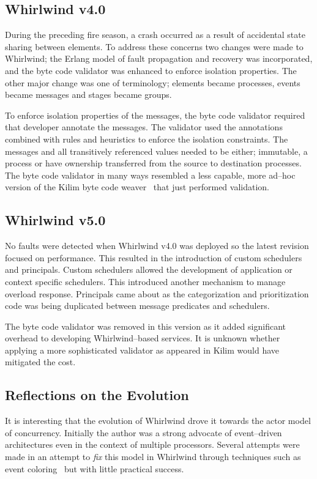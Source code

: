 \documentclass[conference]{IEEEtran}
\begin{document}
\subsection{Whirlwind v4.0}

During the preceding fire season, a crash occurred as a result of accidental state sharing between elements. To address these concerns two changes were made to Whirlwind; the Erlang model of fault propagation and recovery was incorporated, and the byte code validator was enhanced to enforce isolation properties. The other major change was one of terminology; elements became processes, events became messages and stages became groups.

To enforce isolation properties of the messages, the byte code validator required that developer annotate the messages. The validator used the annotations combined with rules and heuristics to enforce the isolation constraints. The messages and all transitively referenced values needed to be either; immutable, a process or have ownership transferred from the source to destination processes. The byte code validator in many ways resembled a less capable, more ad--hoc version of the Kilim byte code weaver~\cite{Srinivasan:08:Kilim} that just performed validation.

\subsection{Whirlwind v5.0}

No faults were detected when Whirlwind v4.0 was deployed so the latest revision focused on performance. This resulted in the introduction of custom schedulers and principals. Custom schedulers allowed the development of application or context specific schedulers. This introduced another mechanism to manage overload response. Principals came about as the categorization and prioritization code was being duplicated between message predicates and schedulers.

The byte code validator was removed in this version as it added significant overhead to developing Whirlwind--based services. It is unknown whether applying a more sophisticated validator as appeared in Kilim would have mitigated the cost.

\subsection{Reflections on the Evolution}

It is interesting that the evolution of Whirlwind drove it towards the actor model of concurrency. Initially the author was a strong advocate of event--driven architectures even in the context of multiple processors. Several attempts were made in an attempt to \emph{fix} this model in Whirlwind through techniques such as event coloring~\cite{Dabek02EventDriven} but with little practical success. 
\end{document}
